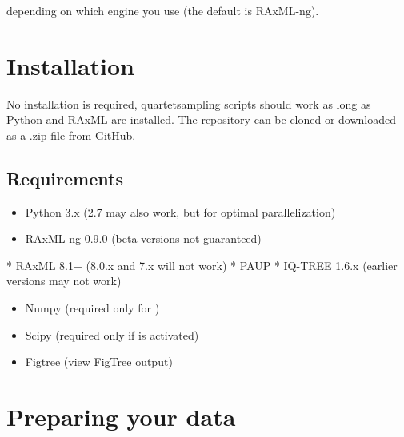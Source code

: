 \documentclass[letterpaper,12pt,english]{sphinxmanual}
\begin{document}
 depending on which engine you use (the default is RAxML-ng).


\section{Installation}
\label{\detokenize{intro:installation}}
No installation is required, quartetsampling scripts should work as long as Python and RAxML are installed.  The repository can be cloned or downloaded as a .zip file from GitHub.


\subsection{Requirements}
\label{\detokenize{intro:requirements}}\begin{itemize}
\item {} 
Python 3.x (2.7 may also work, but  for optimal parallelization) 

\item {} 
RAxML-ng 0.9.0 (beta versions not guaranteed) 

\end{itemize}

* RAxML 8.1+ (8.0.x and 7.x will not work) 
* PAUP  
* IQ-TREE 1.6.x (earlier versions may not work) 

\begin{itemize}
\item {} 
Numpy  (required only for )

\item {} 
Scipy  (required only if  is activated)

\item {} 
Figtree  (view FigTree output)

\end{itemize}


\section{Preparing your data}
\label{\detokenize{intro:preparing-your-data}}
\end{document}
